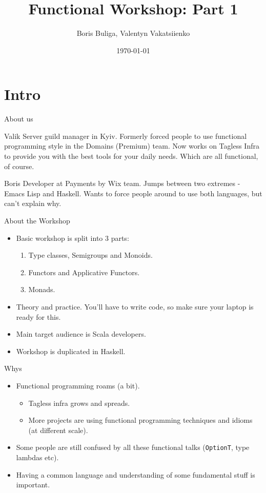 \documentclass[presentation,aspectratio=169,smaller]{beamer}
\author{Boris Buliga, Valentyn Vakatsiienko}
\date{\today}
\title{Functional Workshop: Part 1}
\begin{document}
\maketitle

\section*{Intro}
\label{sec:orgacdba30}

\begin{frame}[label={sec:orgb3b50a6}]{About us}
\begin{block}{Valik}
Server guild manager in Kyiv. Formerly forced people to use functional
programming style in the Domains (Premium) team. Now works on Tagless Infra to
provide you with the best tools for your daily needs. Which are all functional,
of course.

\pause
\end{block}

\begin{block}{Boris}
Developer at Payments by Wix team. Jumps between two extremes - Emacs Lisp and
Haskell. Wants to force people around to use both languages, but can't explain
why.
\end{block}
\end{frame}

\begin{frame}[label={sec:orge79ef3c}]{About the Workshop}
\begin{itemize}
\item Basic workshop is split into 3 parts:
\begin{enumerate}
\item Type classes, Semigroups and Monoids.
\item Functors and Applicative Functors.
\item Monads.
\end{enumerate}
\item Theory and practice. You'll have to write code, so make sure your laptop is
ready for this.
\item Main target audience is Scala developers.
\item Workshop is duplicated in Haskell.
\end{itemize}
\end{frame}

\begin{frame}[label={sec:org9a2bdff},fragile]{Whys}
 \begin{itemize}
\item Functional programming roams (a bit).
\begin{itemize}
\item Tagless infra grows and spreads.
\item More projects are using functional programming techniques and idioms (at
different scale).
\end{itemize}
\item Some people are still confused by all these functional talks (\texttt{OptionT}, type
lambdas etc).
\item Having a common language and understanding of some fundamental stuff is
important.
\end{itemize}
\end{frame}
\end{document}

